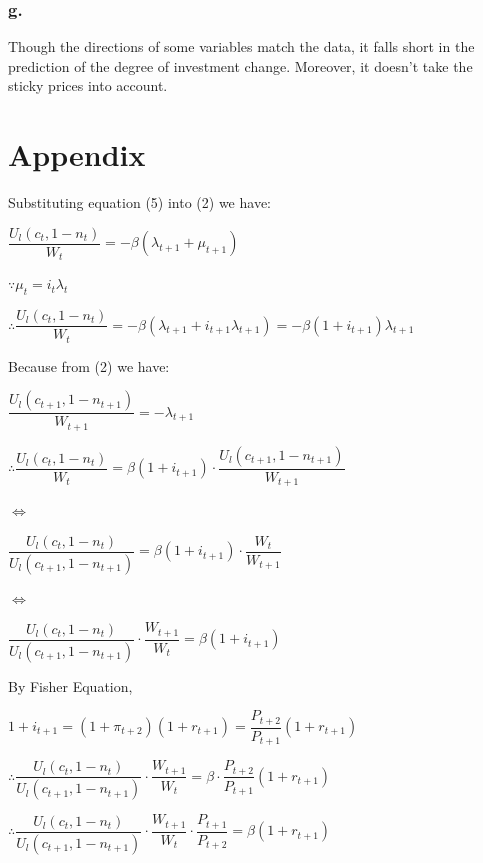 \documentclass{article}
\begin{document}
\subsubsection*{\textrm{g.}}

Though the directions of some variables match the data, it falls short in the prediction of the degree of investment change. Moreover, it doesn't take the sticky prices into account. 

\section*{\textbf{Appendix}}

Substituting equation (5) into (2) we have:

$\dfrac{U_{l}\left(c_{t},1-n_{t}\right)}{W_{t}}=-\beta\left(\lambda_{t+1}+\mu_{t+1}\right)$

$\because\mu_{t}=i_{t}\lambda_{t}$

$\therefore \dfrac{U_{l}\left(c_{t},1-n_{t}\right)}{W_{t}}=-\beta\left(\lambda_{t+1}+i_{t+1}\lambda_{t+1}\right)=-\beta\left(1+i_{t+1}\right)\lambda_{t+1}$

Because from (2) we have:

$\dfrac{U_{l}\left(c_{t+1},1-n_{t+1}\right)}{W_{t+1}}=-\lambda_{t+1}$

$\therefore \dfrac{U_{l}\left(c_{t},1-n_{t}\right)}{W_{t}}=\beta\left(1+i_{t+1}\right)\cdot\dfrac{U_{l}\left(c_{t+1},1-n_{t+1}\right)}{W_{t+1}}$

$\iff$

$\dfrac{U_{l}\left(c_{t},1-n_{t}\right)}{U_{l}\left(c_{t+1},1-n_{t+1}\right)}=\beta\left(1+i_{t+1}\right)\cdot\dfrac{W_{t}}{W_{t+1}}$

$\iff$

$\dfrac{U_{l}\left(c_{t},1-n_{t}\right)}{U_{l}\left(c_{t+1},1-n_{t+1}\right)}\cdot\dfrac{W_{t+1}}{W_{t}}=\beta\left(1+i_{t+1}\right)$

By Fisher Equation,

$1+i_{t+1}=\left(1+\pi_{t+2}\right)\left(1+r_{t+1}\right)=\dfrac{P_{t+2}}{P_{t+1}}\left(1+r_{t+1}\right)$

$\therefore\dfrac{U_{l}\left(c_{t},1-n_{t}\right)}{U_{l}\left(c_{t+1},1-n_{t+1}\right)}\cdot\dfrac{W_{t+1}}{W_{t}}=\beta\cdot\dfrac{P_{t+2}}{P_{t+1}}\left(1+r_{t+1}\right)$

$\therefore\dfrac{U_{l}\left(c_{t},1-n_{t}\right)}{U_{l}\left(c_{t+1},1-n_{t+1}\right)}\cdot\dfrac{W_{t+1}}{W_{t}}\cdot\dfrac{P_{t+1}}{P_{t+2}}=\beta\left(1+r_{t+1}\right)$
\end{document}
